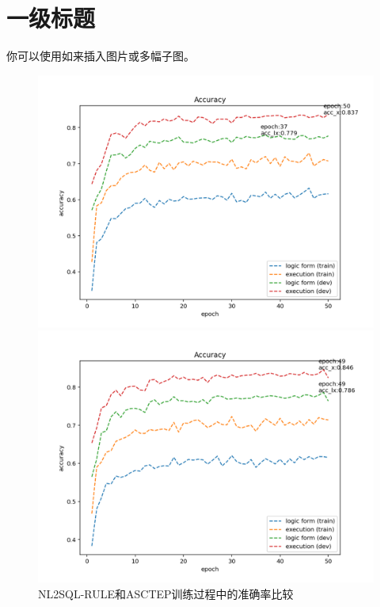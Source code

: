
\chapter{一级标题}

你可以使用如来插入图片或多幅子图。


\begin{figure}[htbp]
	\begin{minipage}[t]{0.5\linewidth}
		\centering
		\includegraphics[width=0.99\linewidth]{.asserts/acc_NL2SQL_no_EG_400_200_e50.png}
	\end{minipage}
	\begin{minipage}[t]{0.5\linewidth}
		\centering
		\includegraphics[width=0.99\linewidth]{.asserts/acc_ASCTEP_no_EG_400_200_e50.png}
	\end{minipage}
	\caption{NL2SQL-RULE和ASCTEP训练过程中的准确率比较}
	\label{fig:acc-no-EG-400-200}
\end{figure}


